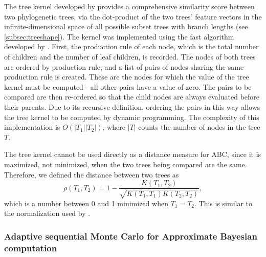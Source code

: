 The tree kernel developed by \textcite{poon2013mapping} provides a
comprehensive similarity score between two phylogenetic trees, via the
dot-product of the two trees' feature vectors in the infinite-dimensional space
of all possible subset trees with branch lengths (see \cref{subsec:treeshape}).
The kernel was implemented using the fast algorithm developed by
\textcite{moschitti2006making}. First, the production rule of each node, which
is the total number of children and the number of leaf children, is recorded.
The nodes of both trees are ordered by production rule, and a list of pairs of
nodes sharing the same production rule is created. These are the nodes for
which the value of the tree kernel must be computed - all other pairs have a
value of zero. The pairs to be compared are then re-ordered so that the child
nodes are always evaluated before their parents. Due to its recursive
definition, ordering the pairs in this way allows the tree kernel to be
computed by dynamic programming. The complexity of this implementation is
$O(|T_1||T_2|)$, where $|T|$ counts the number of nodes in the tree $T$.

The tree kernel cannot be used directly as a distance measure for \gls{ABC},
since it is maximized, not minimized, when the two trees being compared are the
same. Therefore, we defined the distance between two trees as
\[
  \rho(T_1, T_2) = 1 - \frac{K(T_1, T_2)}{\sqrt{K(T_1, T_1) K(T_2, T_2)}},
\]
which is a number between 0 and 1 minimized when $T_1 = T_2$. This is similar
to the normalization used by \textcite{collins2002new, poon2013mapping}.

\subsubsection*{Adaptive sequential Monte Carlo for Approximate Bayesian computation}
\label{subsubsec:adaptsmc}

